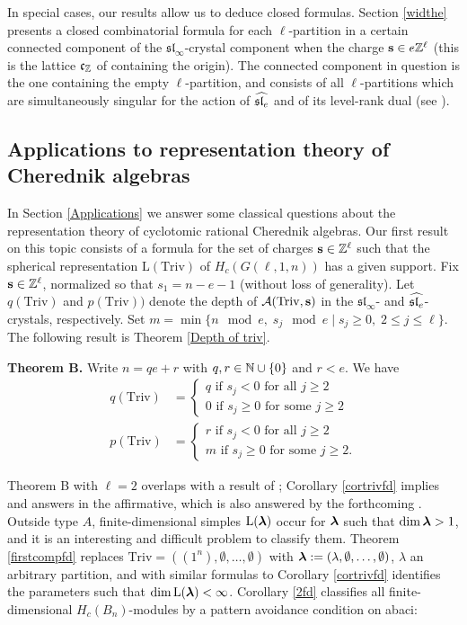 \documentclass[12pt]{amsart}
\numberwithin{equation}{section}
\theoremstyle{definition}
\newcommand{\el}{\mathrm{L}}
\newcommand{\emp}{\emptyset}
\newcommand{\slinf}{\mathfrak{sl}_\infty}
\newcommand{\mbs}{\mathbf{s}}
\newcommand{\triv}{\mathrm{Triv}}
\begin{document}
In special cases, our results allow us to deduce closed formulas. Section \ref{widthe} presents a closed combinatorial formula for each $\ell$-partition in a certain connected component of the $\slinf$-crystal component when the charge $\mbs\in e\Z^\ell$ (this is the lattice $\mathfrak{c_{\mathbb{Z}}}$ of \cite[Section 1.2]{Losev2015} containing the origin). 
The connected component in question is the one containing the empty $\ell$-partition, and consists of all $\ell$-partitions which are simultaneously singular for the action of 
$\widehat{\mathfrak{sl}_e}$ and of its level-rank dual (see \cite{Gerber2016}). 

\subsection*{Applications to representation theory of Cherednik algebras}

In Section \ref{Applications} we answer some classical questions about the representation theory of cyclotomic rational Cherednik algebras. 
Our first result on this topic consists of a formula for the set of charges $\mbs\in\Z^\ell$ such that the spherical representation $\el(\triv)$ of $H_c(G(\ell,1,n))$ has a given support. 
Fix $\mbs\in\Z^\ell$, normalized so that $s_1=n-e-1$ 
(without loss of generality).
Let $q(\triv)$ and $p(\triv))$ denote the depth of $\cA( \triv, \bs )$ in the $\slinf$- and $\widehat{\mathfrak{sl}_e}$-crystals, respectively. Set $m=\min\{n \mod e,\; s_j \mod e\;|\;s_j\geq 0,\; 2\leq j\leq \ell \}.$ 
The following result is Theorem \ref{Depth of triv}.

\medskip

\textbf{Theorem B.} 
Write $n=qe+r$ with $q,r\in\mathbb{N}\cup\{0\}$ and $r<e$.  We have
\begin{align*}
q(\triv)&=\begin{cases} q\mbox{ if } s_j<0\mbox{ for all }j\geq 2 \\
0\mbox{ if }s_j\geq 0\mbox{ for some }j \geq 2
\end{cases}\\
p(\triv)&=\begin{cases} r\mbox{ if }s_j<0\mbox{ for all }j\geq 2 \\
m \mbox{ if }s_j\geq 0 \mbox{ for some }j\geq 2.
\end{cases}
\end{align*}

\medskip

Theorem B with $\ell=2$ overlaps with a result of \cite[Section 4.2]{Etingof2012}; Corollary \ref{cortrivfd} implies \cite[Corollary 5.4]{GGJL} and answers \cite[Question 5.5]{GGJL} in the affirmative, which is also answered by the forthcoming \cite{GriffethJuteau2017}.
Outside type $A$, finite-dimensional simples $\el(\bla)$ occur for $\boldsymbol{\lambda}$ such that $\dim\boldsymbol{\lambda}>1$, and it is an interesting and difficult problem to classify them. Theorem \ref{firstcompfd} replaces $\triv=((1^n),\emp,\dots,\emp)$ with $\bla:=(\lambda,\emp,\dots,\emp)$, $\lambda$ an arbitrary partition, and with similar formulas to Corollary \ref{cortrivfd} identifies the parameters such that $\dim\el(\bla)<\infty$.
Corollary \ref{2fd} classifies all finite-dimensional $H_c(B_n)$-modules by a pattern avoidance condition on abaci:
\end{document}
